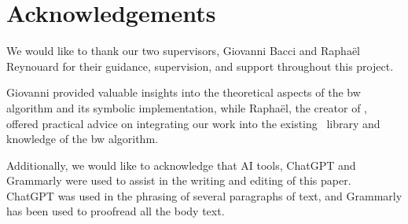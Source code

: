 \section{Acknowledgements}\label{sec:acknowledgements}
We would like to thank our two supervisors, Giovanni Bacci and Raphaël Reynouard for their guidance, supervision, and support throughout this project.

Giovanni provided valuable insights into the theoretical aspects of the \gls{bw} algorithm and its symbolic implementation, while Raphaël, the creator of \Jajapy, offered practical advice on integrating our work into the existing \Jajapy\ library and knowledge of the \gls{bw} algorithm.

Additionally, we would like to acknowledge that AI tools, ChatGPT and Grammarly were used to assist in the writing and editing of this paper.
ChatGPT was used in the phrasing of several paragraphs of text, and Grammarly has been used to proofread all the body text.
